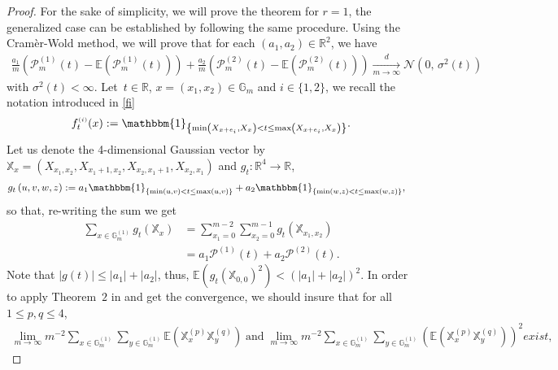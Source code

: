 \documentclass[12pt]{article}
\theoremstyle{Theorem}
\theoremstyle{definition}
\begin{document}
\begin{proof} For the sake of simplicity, we will prove the theorem for $r=1$, the generalized case can be established by following the same procedure. Using the Cramèr-Wold method, we will prove that for each $(a_1, a_2) \in \mathbb{R}^{2}$, we have 
\begin{align*}
\frac{a_{1}}{m}\left(\mathcal{P}^{\scriptscriptstyle (1)}_{m}(t) - \mathbb{E}\left(\mathcal{P}^{\scriptscriptstyle (1)}_{m}(t)\right)\right) + \frac{a_{2}}{m}\left(\mathcal{P}^{\scriptscriptstyle (2)}_{m}(t) - \mathbb{E}\left(\mathcal{P}^{\scriptscriptstyle (2)}_{m}(t)\right)\right) \xrightarrow[m \to \infty]{d} \mathcal{N}\left(0,\,\sigma^{2}(t)\right) 
\end{align*}
with $\sigma^{2}(t) < \infty$. Let~$ t \in \mathbb{R}$, $x=(x_{1}, x_{2}) \in \mathbb{G}_{m}$ and $i \in \{1,2\}$, we recall the notation introduced in \eqref{fi}
\begin{align*}
f_{t}^{\scriptscriptstyle (i)}(x) := \mathbbm{1}_{\left\{\min\left(X_{x+e_{i}}, X_{\scriptscriptstyle x}\right) < t \leq \max\left(X_{x+e_{i}}, X_{\scriptscriptstyle x}\right)\right\}}.
\end{align*}
Let us denote the 4-dimensional Gaussian vector by $\mathbb{X}_{x} = (X_{x_1, x_2}, X_{x_1 + 1, x_2}, X_{x_2, x_1+1}, X_{x_2, x_1} )$ and $g_{t} : \mathbb{R}^{4} \to \mathbb{R}$, 
\begin{align*}
g_{t}\left(u,v, w, z\right) & := a_{1}\mathbbm{1}_{\left\{\min\left(u, v\right) < t \leq \max\left(u, v\right)\right\}} + a_{2}\mathbbm{1}_{\left\{\min\left(w, z\right) < t \leq \max\left(w, z\right)\right\}},
\end{align*}
so that, re-writing the sum we get
\begin{align*} 
\sum_{x \in \mathbb{G}^{(1)}_{m}} g_{t}\left(\mathbb{X}_{x}\right)  & = \sum_{x_1 = 0}^{m-2}\sum_{x_2 = 0}^{m-1} g_{t}\left(\mathbb{X}_{x_{1}, x_{2}}\right)  \\
&=  a_{1}\mathcal{P}^{\scriptscriptstyle (1)}(t) + a_{2}\mathcal{P}^{\scriptscriptstyle (2)}(t).
\end{align*}
Note that $\left|g(t)\right| \leq \left|a_{1}\right| + \left|a_{2}\right|$, thus, $\mathbb{E}\left(g_{t}\left(\mathbb{X}_{\scriptscriptstyle  0, 0}\right)^{2}\right) < (|a_{1}| + |a_{2}|)^{2}$. In order to apply Theorem~$2$ in \cite{arcones} and get the convergence, we should insure that for all $1 \leq p,q \leq 4$, 
\begin{align*}
\lim_{m \to \infty} m^{-2} \sum_{x \in \mathbb{G}^{\scriptscriptstyle (1)}_{m}}\sum_{y \in \mathbb{G}^{\scriptscriptstyle (1)}_{m}} \mathbb{E}\left(\mathbb{X}^{(p)}_{x}\mathbb{X}^{(q)}_{y}\right) \; \text{and} \; \lim_{m \to \infty} m^{-2} \sum_{x \in \mathbb{G}^{\scriptscriptstyle (1)}_{m}}\sum_{y \in \mathbb{G}^{\scriptscriptstyle (1)}_{m}} \left(\mathbb{E}\left(\mathbb{X}^{(p)}_{x}\mathbb{X}^{(q)}_{y}\right)\right)^{2} exist,

\end{align*}
\end{proof}
\end{document}
